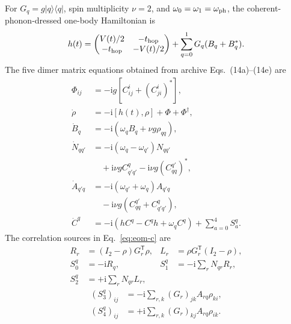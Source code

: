 \documentclass[10pt,twocolumn]{article}
\newcommand{\ii}{\mathrm i}
\newcommand{\I}{I}
\begin{document}
For $G_q=g|q\rangle\langle q|$, spin multiplicity $\nu=2$, and
$\omega_0=\omega_1=\omega_{\rm ph}$, the coherent-phonon-dressed one-body
Hamiltonian is
\begin{equation}
h(t)=
\begin{pmatrix}V(t)/2&-t_{\rm hop}\\-t_{\rm hop}&-V(t)/2\end{pmatrix}
+\sum_{q=0}^{1}G_q(B_q+B_q^*).
\label{eq:one-body-h}
\end{equation}
The five dimer matrix equations obtained from archive Eqs.~(14a)--(14e) are
\begin{subequations}\label{eq:dimer-eoms}
\begin{align}
\Phi_{ij}&=-\ii g[C^i_{ij}+(C^i_{ji})^*],\\
\dot\rho&=-\ii[h(t),\rho]+\Phi+\Phi^\dagger,
\label{eq:eom-rho}\\
\dot B_q&=-\ii(\omega_qB_q+\nu g\rho_{qq}),
\label{eq:eom-b}\\
\dot N_{qq'}&=-\ii(\omega_q-\omega_{q'})N_{qq'}\\
&\quad +\ii\nu gC^q_{q'q'}-\ii\nu g(C^{q'}_{qq})^*,
\label{eq:eom-n}\\
\dot A_{q'q}&=-\ii(\omega_{q'}+\omega_q)A_{q'q}\\
&\quad -\ii\nu g(C^{q'}_{qq}+C^q_{q'q'}),
\label{eq:eom-a}\\
\dot C^q&=-\ii(hC^q-C^qh+\omega_qC^q)+\sum_{a=0}^{4}S_a^q .
\label{eq:eom-c}
\end{align}
\end{subequations}
The correlation sources in Eq.~\eqref{eq:eom-c} are
\begin{equation}
\begin{aligned}
R_r&=(\I_2-\rho)G_r^{\mathsf T}\rho,
&L_r&=\rho G_r^{\mathsf T}(\I_2-\rho),\\
S_0^q&=-\ii R_q,
&S_1^q&=-\ii\sum_rN_{qr}R_r,\\
S_2^q&=+\ii\sum_rN_{qr}L_r,
\end{aligned}
\label{eq:c-sources-a}
\end{equation}
\begin{equation}
\begin{aligned}
(S_3^q)_{ij}&=-\ii\sum_{r,k}(G_r)_{jk}A_{rq}\rho_{ki},\\
(S_4^q)_{ij}&=+\ii\sum_{r,k}(G_r)_{kj}A_{rq}\rho_{ik}.
\end{aligned}
\label{eq:c-sources-b}
\end{equation}
\end{document}
